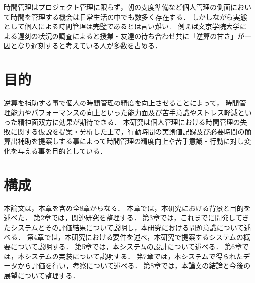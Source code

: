 時間管理はプロジェクト管理に限らず，朝の支度準備など個人管理の側面において時間を管理する機会は日常生活の中でも数多く存在する．
しかしながら実態として個人による時間管理は完璧であるとは言い難い．
例えば文京学院大学による遅刻の状況の調査によると授業・友達の待ち合わせ共に「逆算の甘さ」が一因となり遅刻すると考えている人が多数を占める\cite{bunkyo}．

\section{目的}
逆算を補助する事で個人の時間管理の精度を向上させることによって，
時間管理能力やパフォーマンスの向上といった能力面及び苦手意識やストレス軽減といった精神面双方に効果が期待できる．
本研究は個人管理における時間管理の失敗に関する仮説を提案・分析した上で，行動時間の実測値記録及び必要時間の簡算出補助を提案しする事によって時間管理の精度向上や苦手意識・行動に対し変化を与える事を目的としている．

\section{構成}
本論文は，本章を含め全8章からなる．
本章では，本研究における背景と目的を述べた．
第2章では，関連研究を整理する．
第3章では，これまでに開発してきたシステムとその評価結果について説明し，本研究における問題意識について述べる．
第4章では，本研究における要件を述べ，本研究で提案するシステムの概要について説明する．
第5章では，本システムの設計について述べる．
第6章では，本システムの実装について説明する．
第7章では，本システムで得られたデータから評価を行い，考察について述べる．
第8章では，本論文の結論と今後の展望について整理する．